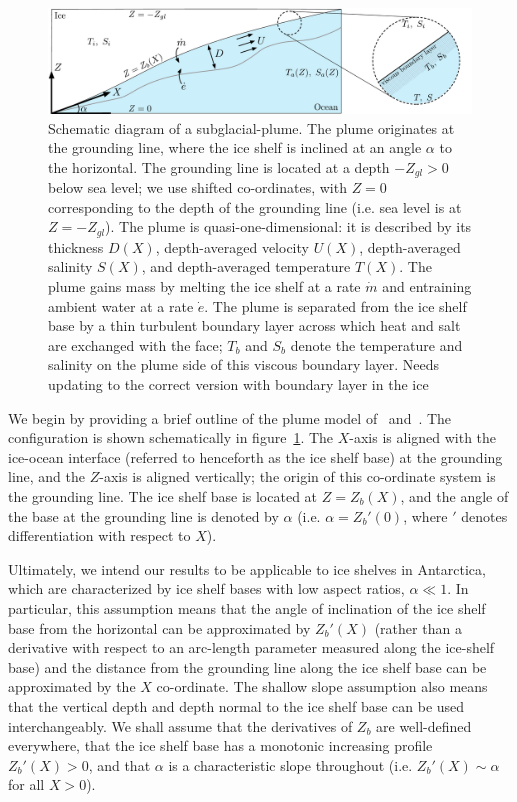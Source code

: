 \documentclass[openacc]{rsproca_new}%
\newcommand{\red}[1]{{\color{red} #1}}
\begin{document}
\begin{figure}
\centering
\includegraphics[width = \textwidth]{Submitted_PRSA/make_plots/plots/figure1.pdf}
\caption{Schematic diagram of a subglacial-plume. The plume originates at the grounding line, where the ice shelf is inclined at an angle $\alpha$ to the horizontal. The grounding line is located at a depth $-Z_{gl} >0$ below sea level; we use shifted co-ordinates, with $Z = 0$ corresponding to the depth of the grounding line (i.e. sea level is at $Z = -Z_{gl}$). The plume is quasi-one-dimensional: it is described by its thickness $D(X)$, depth-averaged velocity $U(X)$, depth-averaged salinity $S(X)$, and depth-averaged temperature $T(X)$.  The plume gains mass by melting the ice shelf at a rate $\dot{m}$ and entraining ambient water at a rate $\dot{e}$. The plume is separated from the ice shelf base by a thin turbulent boundary layer across which heat and salt are exchanged with the face; $T_b$ and $S_b$ denote the temperature and salinity on the plume side of this viscous boundary layer. \red{Needs updating to the correct version with boundary layer in the ice} }\label{fig:Schematic}
\end{figure}

We begin by providing a brief outline of the plume model of~\cite{Jenkins1991JGeophysResOceans} and~\cite{Jenkins2011JPhysOcean}. The configuration is shown schematically in figure~\ref{fig:Schematic}. The $X$-axis is aligned with the ice-ocean interface (referred to henceforth as the ice shelf base) at the grounding line, and the $Z$-axis is aligned vertically; the origin of this co-ordinate system is the grounding line. The ice shelf base is located at $Z = Z_b(X)$, and the angle of the base at the grounding line is denoted by $\alpha$ (i.e. $\alpha = Z_b'(0)$, where $'$ denotes differentiation with respect to $X$).

Ultimately, we intend our results to  be applicable to ice shelves in Antarctica, which are characterized by ice shelf bases with low aspect ratios, $\alpha \ll 1$. In particular, this assumption means that the angle of inclination of the ice shelf base from the horizontal can be approximated by $Z_b'(X)$ (rather than a derivative with respect to an arc-length parameter measured along the ice-shelf base) and the distance from the grounding line along the ice shelf base can be approximated by the $X$ co-ordinate. The shallow slope assumption also means that the vertical depth and depth normal to the ice shelf base can be used interchangeably. We shall assume that the derivatives of $Z_b$ are well-defined everywhere, that the ice shelf base has a monotonic increasing profile $Z_b'(X) >0$, and that $\alpha$ is a characteristic slope throughout (i.e. $Z_b'(X)\sim \alpha$ for all $X >0$). 
\end{document}
